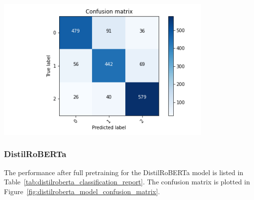 \documentclass[acmsmall,nonacm]{acmart}
\begin{document}
\vspace*{5ex}
\begin{minipage}[h!]{\textwidth}
  \begin{minipage}[b]{0.49\textwidth}
    \centering
      \includegraphics[width=0.8\textwidth]{assets/roberta_confusion_matrix.png}
      \label{fig:roberta_model_confusion_matrix}
  \end{minipage}
  \hfill
  \begin{minipage}[b]{0.49\textwidth}
    \centering
      \newline
      \label{tab:roberta_classification_report}
    \end{minipage}
  \end{minipage}




\subsubsection{DistilRoBERTa}
The performance after full pretraining for the DistilRoBERTa model is listed in Table~\ref{tab:distilroberta_classification_report}. The confusion matrix is plotted in Figure~\ref{fig:distilroberta_model_confusion_matrix}.
\end{document}
